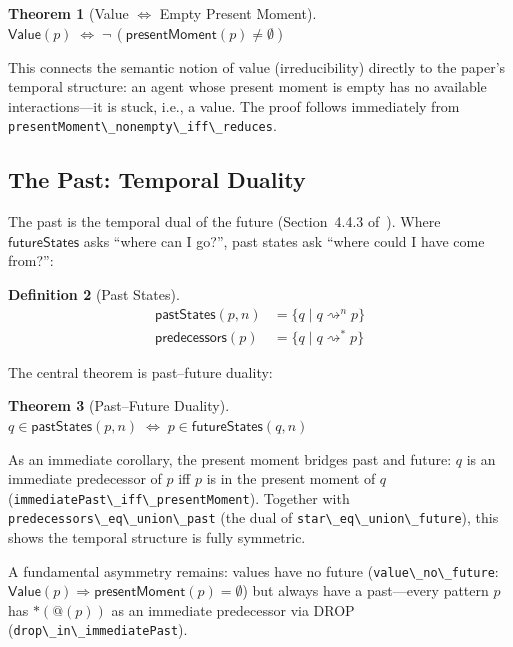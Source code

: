 \documentclass[11pt,a4paper]{article}
\makeatletter
\newtheorem{theorem}{Theorem}[section]
\theoremstyle{definition}
\newtheorem{definition}[theorem]{Definition}
\theoremstyle{remark}
\newcommand{\pquote}[1]{@(#1)}
\newcommand{\pdrop}[1]{*(#1)}
\newcommand{\reducesN}[1]{\rightsquigarrow^{#1}}
\newcommand{\reducesStar}{\rightsquigarrow^{*}}
\newcommand{\lean}[1]{\lstinline[language=Lean4]{#1}}
\makeatother
\begin{document}
\begin{theorem}[Value $\iff$ Empty Present Moment]
\label{thm:value-pm}
$\mathsf{Value}(p) \;\iff\; \lnot\,(\mathsf{presentMoment}(p) \neq \emptyset)$
\end{theorem}

This connects the semantic notion of value (irreducibility) directly to the
paper's temporal structure: an agent whose present moment is empty has no
available interactions---it is stuck, i.e., a value. The proof follows
immediately from \lean{presentMoment\_nonempty\_iff\_reduces}.

\subsection{The Past: Temporal Duality}
\label{sec:past}

The past is the temporal dual of the future (Section~4.4.3
of~\cite{meredith2026spice}).  Where $\mathsf{futureStates}$ asks ``where can I
go?'', past states ask ``where could I have come from?'':

\begin{definition}[Past States]
\begin{align*}
  \mathsf{pastStates}(p, n) &= \{ q \mid q \reducesN{n} p \} \\
  \mathsf{predecessors}(p) &= \{ q \mid q \reducesStar p \}
\end{align*}
\end{definition}

The central theorem is past--future duality:

\begin{theorem}[Past--Future Duality]
$q \in \mathsf{pastStates}(p, n) \;\iff\; p \in \mathsf{futureStates}(q, n)$
\end{theorem}

As an immediate corollary, the present moment bridges past and future:
$q$ is an immediate predecessor of $p$ iff $p$ is in the present moment of $q$
(\lean{immediatePast\_iff\_presentMoment}).  Together with
\lean{predecessors\_eq\_union\_past} (the dual of \lean{star\_eq\_union\_future}),
this shows the temporal structure is fully symmetric.

A fundamental asymmetry remains: values have no future
(\lean{value\_no\_future}: $\mathsf{Value}(p) \Rightarrow \mathsf{presentMoment}(p) = \emptyset$)
but always have a past---every pattern $p$ has $\pdrop{\pquote{p}}$ as an
immediate predecessor via DROP (\lean{drop\_in\_immediatePast}).
\end{document}
